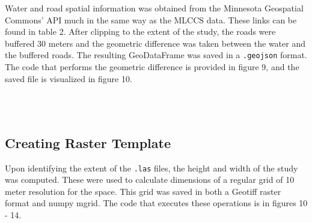 \documentclass[article,12pt]{article}
\numberwithin{equation}{section}
\begin{document}
Water and road spatial information was obtained from the Minnesota Geospatial Commons' API much in the same way as the MLCCS data. These links can be found in table 2. After clipping to the extent of the study, the roads were buffered 30 meters and the geometric difference was taken between the water and the buffered roads. The resulting GeoDataFrame was saved in a \texttt{.geojson} format. The code that performs the geometric difference is provided in figure 9, and the saved file is visualized in figure 10.




\begin{adjustwidth}{-.7in}{-.7in}
	\\
\\
\end{adjustwidth}

\subsection{Creating Raster Template}

Upon identifying the extent of the \texttt{.las} files, the height and width of the study was computed. These were used to calculate dimensions of a regular grid of 10 meter resolution for the space. This grid was saved in both a Geotiff raster format and numpy mgrid. The code that executes these operations is in figures 10 - 14.
\end{document}
